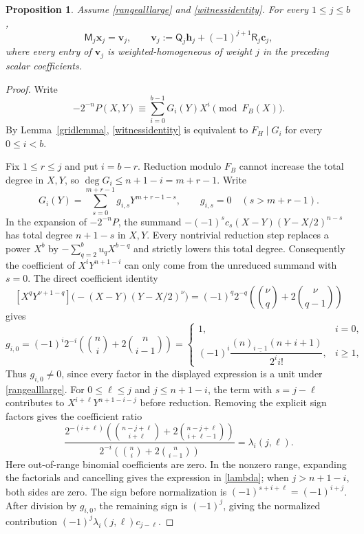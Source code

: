 \documentclass[10pt,a4paper]{amsart}
\newtheorem{proposition}{Proposition}[section]
\newcommand{\fall}[2]{(#1)_{\underline{#2}}}
\begin{document}
\begin{proposition}\label{largegaprecursion}
Assume \eqref{rangealllarge} and \eqref{witnessidentity}.  For every
$1\le j\le b$,
\begin{equation}\label{coefficient_system}
 \mathsf M_j\mathbf x_j=\mathbf v_j,
 \qquad
 \mathbf v_j:=\mathsf Q_j\mathbf h_j
              +(-1)^{j+1}\mathsf R_j\mathbf c_j,
\end{equation}
where every entry of $\mathbf v_j$ is weighted-homogeneous of weight
$j$ in the preceding scalar coefficients.
\end{proposition}
\begin{proof}
Write
\[
 -2^{-n}P(X,Y)\equiv\sum_{i=0}^{b-1}G_i(Y)X^i
                  \pmod{F_B(X)}.
\]
By Lemma~\ref{gridlemma}, \eqref{witnessidentity} is equivalent to
$F_H\mid G_i$ for every $0\le i<b$.

Fix $1\le r\le j$ and put $i=b-r$.  Reduction modulo $F_B$ cannot
increase the total degree in $X,Y$, so $\deg G_i\le n+1-i=m+r-1$.
Write
\[
 G_i(Y)=\sum_{s=0}^{m+r-1}g_{i,s}Y^{m+r-1-s},
 \qquad g_{i,s}=0\quad(s>m+r-1).
\]
In the expansion of $-2^{-n}P$, the summand
$-(-1)^sc_s(X-Y)(Y-X/2)^{n-s}$ has total degree $n+1-s$ in $X,Y$.
Every nontrivial reduction step replaces a power $X^b$ by
$-\sum_{q=2}^{b}u_qX^{b-q}$ and strictly lowers this total degree.
Consequently the coefficient of $X^iY^{n+1-i}$ can only come from
the unreduced summand with $s=0$.  The direct coefficient identity
\[
 [X^qY^{\nu+1-q}]\bigl(-(X-Y)(Y-X/2)^\nu\bigr)
 =(-1)^q2^{-q}
 \left(\binom{\nu}{q}+2\binom{\nu}{q-1}\right)
\]
gives
\begin{equation}\label{leading_gi}
 g_{i,0}=(-1)^i2^{-i}
 \left(\binom ni+2\binom n{i-1}\right)
 =\begin{cases}
 1,&i=0,\\[1mm]
 (-1)^i\dfrac{\fall n{i-1}(n+i+1)}{2^ii!},&i\ge1,
 \end{cases}
\end{equation}
Thus $g_{i,0}\ne0$, since every factor in the displayed expression
is a unit under \eqref{rangealllarge}.  For $0\le\ell\le j$ and
$j\le n+1-i$, the term with
$s=j-\ell$ contributes to $X^{i+\ell}Y^{n+1-i-j}$ before reduction.
Removing the explicit sign factors gives the coefficient ratio
\begin{equation*}
 \frac{2^{-(i+\ell)}
  \left(\binom{n-j+\ell}{i+\ell}
              +2\binom{n-j+\ell}{i+\ell-1}\right)}
 {2^{-i}\left(\binom ni+2\binom n{i-1}\right)}
 =\lambda_i(j,\ell).
\end{equation*}
Here out-of-range binomial coefficients are zero.  In the nonzero
range, expanding the factorials and cancelling gives the expression
in \eqref{lambda}; when $j>n+1-i$, both sides are zero.
The sign before normalization is $(-1)^{s+i+\ell}=(-1)^{i+j}$.
After division by $g_{i,0}$, the remaining sign is $(-1)^j$, giving the
normalized contribution $(-1)^j\lambda_i(j,\ell)c_{j-\ell}$.


\end{proof}
\end{document}
